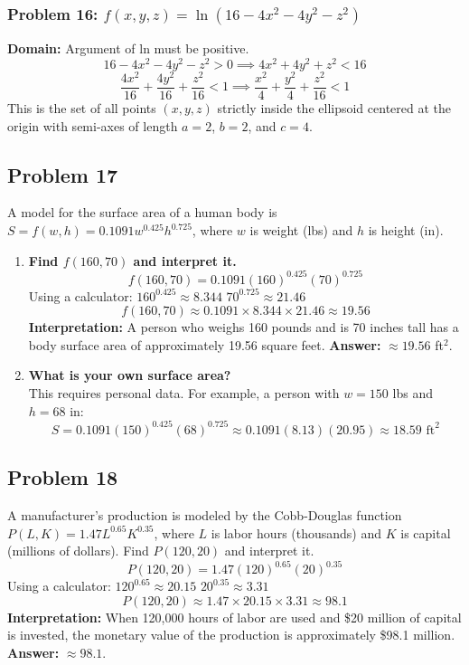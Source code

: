 \documentclass{article}
\begin{document}
\subsubsection{Problem 16: $f(x, y, z) = \ln(16 - 4x^2 - 4y^2 - z^2)$}
\textbf{Domain:} Argument of ln must be positive.
\[ 16 - 4x^2 - 4y^2 - z^2 > 0 \implies 4x^2 + 4y^2 + z^2 < 16 \]
\[ \frac{4x^2}{16} + \frac{4y^2}{16} + \frac{z^2}{16} < 1 \implies \frac{x^2}{4} + \frac{y^2}{4} + \frac{z^2}{16} < 1 \]
This is the set of all points $(x, y, z)$ strictly inside the ellipsoid centered at the origin with semi-axes of length $a=2$, $b=2$, and $c=4$.

\subsection{Problem 17}
A model for the surface area of a human body is $S = f(w, h) = 0.1091 w^{0.425} h^{0.725}$, where $w$ is weight (lbs) and $h$ is height (in).
\begin{enumerate}[label=\alph*.]
    \item \textbf{Find $f(160, 70)$ and interpret it.} \\
    \[ f(160, 70) = 0.1091 (160)^{0.425} (70)^{0.725} \]
    Using a calculator:
    $160^{0.425} \approx 8.344$
    $70^{0.725} \approx 21.46$
    \[ f(160, 70) \approx 0.1091 \times 8.344 \times 21.46 \approx 19.56 \]
    \textbf{Interpretation:} A person who weighs 160 pounds and is 70 inches tall has a body surface area of approximately 19.56 square feet.
    \textbf{Answer:} $\approx 19.56$ ft$^2$.
    \item \textbf{What is your own surface area?} \\
    This requires personal data. For example, a person with $w=150$ lbs and $h=68$ in:
    \[ S = 0.1091 (150)^{0.425} (68)^{0.725} \approx 0.1091(8.13)(20.95) \approx 18.59 \text{ ft}^2 \]
\end{enumerate}

\subsection{Problem 18}
A manufacturer's production is modeled by the Cobb-Douglas function $P(L, K) = 1.47 L^{0.65} K^{0.35}$, where $L$ is labor hours (thousands) and $K$ is capital (millions of dollars). Find $P(120, 20)$ and interpret it.
\[ P(120, 20) = 1.47 (120)^{0.65} (20)^{0.35} \]
Using a calculator:
$120^{0.65} \approx 20.15$
$20^{0.35} \approx 3.31$
\[ P(120, 20) \approx 1.47 \times 20.15 \times 3.31 \approx 98.1 \]
\textbf{Interpretation:} When 120,000 hours of labor are used and \$20 million of capital is invested, the monetary value of the production is approximately \$98.1 million.
\textbf{Answer:} $\approx 98.1$.
\end{document}
